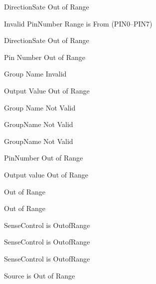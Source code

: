 \begin{DoxyRefList}
\label{todo__todo000003}%
%
Direction\+Sate Out of Range

\label{todo__todo000004}%
%
Invalid Pin\+Number Range is From (PIN0--PIN7)

\label{todo__todo000001}%
%
Direction\+Sate Out of Range 
\item[Global \doxylink{group__DIO_ga9f0c5addc9ce38f40bf9ed22ffe74b92}{m\+DIO\+\_\+\+Toggle\+Pin} (uint8\+\_\+t Group\+Name, uint8\+\_\+t Pin\+Number)]\label{todo__todo000013}%
%
Pin Number Out of Range 

\label{todo__todo000012}%
%
Group Name Invalid  
\item[Global \doxylink{group__DIO_ga5fdac66f5369cea5786052d33c536f15}{m\+DIO\+\_\+\+Write\+Group} (uint8\+\_\+t Group\+Name, uint8\+\_\+t Output\+Value)]\label{todo__todo000011}%
%
Output Value Out of Range 

\label{todo__todo000010}%
%
Group Name Not Valid  
\item[Global \doxylink{group__DIO_ga36ac5855c58aa6fba84c2e20942f64f3}{m\+DIO\+\_\+\+Write\+Pin} (uint8\+\_\+t Group\+Name, uint8\+\_\+t Pin\+Number, uint8\+\_\+t Output\+Value)]\label{todo__todo000007}%
%
Group\+Name Not Valid 

\label{todo__todo000006}%
%
Group\+Name Not Valid 

\label{todo__todo000009}%
%
Pin\+Number Out of Range 

\label{todo__todo000008}%
%
Output value Out of Range  
\item[Global \doxylink{group__EXTI_gaefdac39f98f0bf439554f2beb2652717}{m\+EXTI\+\_\+\+Disable} (uint8\+\_\+t source)]\label{todo__todo000023}%
%
Out of Range 
\item[Global \doxylink{group__EXTI_ga63930277028f2e132114d86158c3493e}{m\+EXTI\+\_\+\+Enable} (uint8\+\_\+t source)]\label{todo__todo000022}%
%
Out of Range 
\item[Global \doxylink{group__EXTI_gaac5e24b7e79b669332ba5ff1966b7f62}{m\+EXTI\+\_\+\+Init} (uint8\+\_\+t source, uint8\+\_\+t sense\+Control)]\label{todo__todo000018}%
%
Sense\+Control is Outof\+Range

\label{todo__todo000019}%
%
Sense\+Control is Outof\+Range

\label{todo__todo000020}%
%
Sense\+Control is Outof\+Range 
\item[Global \doxylink{group__EXTI_ga1fd56d3b68c006c33ed37d94daa17b3b}{m\+EXTI\+\_\+set\+Callback} (uint8\+\_\+t source, void(\texorpdfstring{$\ast$}{*}\+PF)(void))]\label{todo__todo000021}%
%
Source is Out of Range
\end{DoxyRefList}